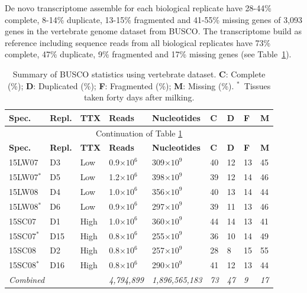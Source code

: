 De novo transcriptome assemble for each biological replicate have 28-44\% complete, 8-14\% duplicate, 13-15\% fragmented and 41-55\% missing genes of 3,093 genes in the vertebrate genome dataset from BUSCO. The transcriptome build as reference including sequence reads from all biological replicates have 73\% complete, 47\% duplicate, 9\% fragmented and 17\% missing genes (see Table~\ref{tab:basics}).

\begin{small}\begin{longtable}[c]{lllllllll}
    \caption{Summary of BUSCO statistics using vertebrate dataset. \textbf{C}: Complete (\%); \textbf{D}: Duplicated (\%); \textbf{F}: Fragmented (\%); \textbf{M}: Missing (\%). \textbf{$^{*}$}~Tissues taken forty days after milking.\label{tab:basics}}\\
    \hline\hline
    \textbf{Spec.} & \textbf{Repl.} & \textbf{TTX} & \textbf{Reads} & \textbf{Nucleotides} & \textbf{C} & \textbf{D} & \textbf{F} & \textbf{M} \\
    \hline
    \endfirsthead
    \multicolumn{9}{c}{Continuation of Table \ref{tab:basics}}\\
    \hline
    \textbf{Spec.} & \textbf{Repl.} & \textbf{TTX} & \textbf{Reads} & \textbf{Nucleotides} & \textbf{C} & \textbf{D} & \textbf{F} & \textbf{M} \\
    \hline
    \endhead
    \hline\endfoot
    \hline\endlastfoot
    15LW07       & D3  & Low  & 0.9$\times 10^{6}$ & 309$\times 10^{9}$ & 40 & 12 & 13 & 45 \\
    15LW07$^{*}$ & D5  & Low  & 1.2$\times 10^{6}$ & 398$\times 10^{9}$ & 39 & 12 & 14 & 46 \\
    15LW08       & D4  & Low  & 1.0$\times 10^{6}$ & 356$\times 10^{9}$ & 40 & 13 & 14 & 44 \\
    15LW08$^{*}$ & D6  & Low  & 0.9$\times 10^{6}$ & 297$\times 10^{9}$ & 39 & 11 & 13 & 46 \\
    15SC07       & D1  & High & 1.0$\times 10^{6}$ & 360$\times 10^{9}$ & 44 & 14 & 13 & 41 \\
    15SC07$^{*}$ & D15 & High & 0.8$\times 10^{6}$ & 255$\times 10^{9}$ & 36 & 10 & 14 & 49 \\
    15SC08       & D2  & High & 0.8$\times 10^{6}$ & 257$\times 10^{9}$ & 28 & 8  & 15 & 55 \\
    15SC08$^{*}$ & D16 & High & 0.8$\times 10^{6}$ & 290$\times 10^{9}$ & 41 & 12 & 13 & 44 \\
    \hline
    \multicolumn{3}{l}{\textit{Combined}} & \textit{4,794,899} & \textit{1,896,565,183} & \textit{73} & \textit{47} & \textit{9} & \textit{17} \\
\end{longtable}\end{small}

